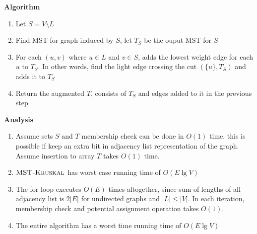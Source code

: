 \documentclass[11pt]{article}
\begin{document}
\begin{enumerate}
    \textbf{Algorithm}
    \begin{enumerate}
        \item Let $S = V \setminus L$
        \item Find MST for graph induced by $S$, let $T_S$ be the ouput MST for $S$
        \item For each $(u,v)$ where $u\in L$ and $v\in S$, adds the lowest weight edge for each $u$ to $T_S$. In other words, find the light edge crossing the cut $(\{u \}, T_S)$ and adds it to $T_S$
        \item Return the augmented $T$, consists of $T_S$ and edges added to it in the previous step
    \end{enumerate}
    \textbf{Analysis}
    \begin{enumerate}
        \item Assume sets $S$ and $T$ membership check can be done in $O(1)$ time, this is possible if keep an extra bit in adjacency list representation of the graph. Assume insertion to array $T$ takes $O(1)$ time.
        \item $\textsc{MST-Kruskal}$ has worst case running time of $O(E\lg V)$
        \item The for loop executes $O(E)$ times altogether, since sum of lengths of all adjacency list is $2|E|$ for undirected graphs and $|L| \leq |V|$. In each iteration, membership check and potential assignment operation takes $O(1)$. 
        \item The entire algorithm has a worst time running time of $O(E\lg V)$
    \end{enumerate}


    \begin{algorithm}[H]


    \end{algorithm}


\end{enumerate}
\end{document}
